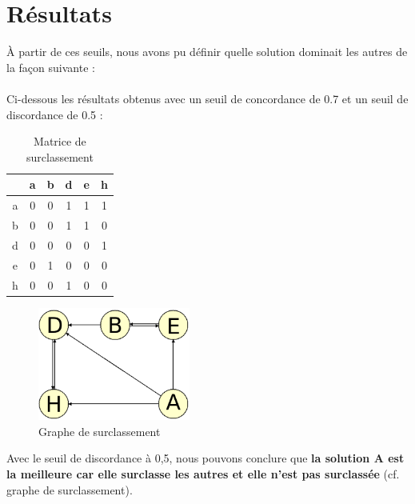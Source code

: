 \documentclass[paper=a4, fontsize=11pt]{report}
\numberwithin{equation}{section}		%
\numberwithin{figure}{section}			%
\numberwithin{table}{section}				%
\begin{document}
\section{Résultats}

À partir de ces seuils, nous avons pu définir quelle solution dominait les autres de la façon suivante : \\

\\

Ci-dessous les résultats obtenus avec un seuil de concordance de 0.7 et un seuil de discordance de 0.5 : 
\begin{multicols}{2}

\begin{table}[H]
\begin{center}
\begin{tabular}{c|ccccc}
 & a & b & d & e & h \\ 
\hline 
a & 0 & 0 & 1 & 1 & 1 \\ 
b & 0 & 0 & 1 & 1 & 0 \\ 
d & 0 & 0 & 0 & 0 & 1 \\ 
e & 0 & 1 & 0 & 0 & 0 \\ 
h & 0 & 0 & 1 & 0 & 0\\ 
\end{tabular} 
\caption{Matrice de surclassement} 
\end{center}
\end{table}
\begin{figure}[H]
\centering
\includegraphics[width=5cm]{figures/GraphDeSurClassement.png}
\caption{Graphe de surclassement}
\end{figure}
\end{multicols}

Avec le seuil de discordance à 0,5, nous pouvons conclure que \textbf{la solution A est la meilleure car elle surclasse les autres et elle n'est pas surclassée} (cf. graphe de surclassement).\\
\end{document}
